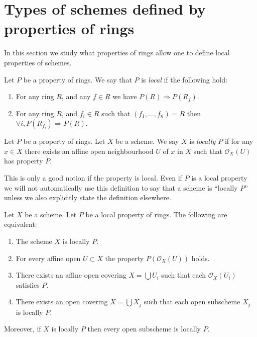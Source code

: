 \section{Types of schemes defined by properties of rings}
\label{section-properties-rings}

\noindent
In this section we study what properties of rings
allow one to define local properties of schemes.

\begin{definition}
\label{definition-property-local}
Let $P$ be a property of rings.
We say that $P$ is {\it local} if the following hold:
\begin{enumerate}
\item For any ring $R$, and any $f \in R$ we have
$P(R) \Rightarrow P(R_f)$.
\item For any ring $R$, and $f_i \in R$ such that
$(f_1, \ldots, f_n) = R$ then
$\forall i, P(R_{f_i}) \Rightarrow P(R)$.
\end{enumerate}
\end{definition}

\begin{definition}
\label{definition-locally-P}
Let $P$ be a property of rings. Let $X$ be a scheme.
We say $X$ is {\it locally $P$} if for any $x \in X$
there exists an affine open neighbourhood $U$ of $x$
in $X$ such that $\mathcal{O}_X(U)$ has property $P$.
\end{definition}

\noindent
This is only a good notion if the property is local.
Even if $P$ is a local property we will not
automatically use this definition to say that a scheme is
``locally $P$'' unless we also explicitly state the definition
elsewhere.

\begin{lemma}
\label{lemma-locally-P}
Let $X$ be a scheme. Let $P$ be a local property of rings.
The following are equivalent:
\begin{enumerate}
\item The scheme $X$ is locally $P$.
\item For every affine open $U \subset X$ the property
$P(\mathcal{O}_X(U))$ holds.
\item There exists an affine open covering $X = \bigcup U_i$ such that
each $\mathcal{O}_X(U_i)$ satisfies $P$.
\item There exists an open covering $X = \bigcup X_j$
such that each open subscheme $X_j$ is locally $P$.
\end{enumerate}
Moreover, if $X$ is locally $P$ then every open subscheme
is locally $P$.
\end{lemma}

